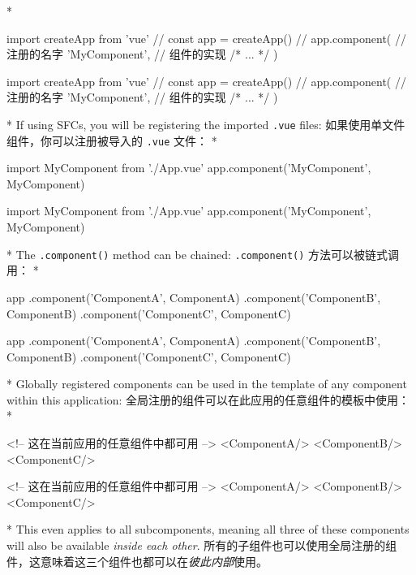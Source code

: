 \begin{paracol}{2}
\switchcolumn[0]*%
\begin{codeJs}
import { createApp } from 'vue'
//
const app = createApp({})
//
app.component(
  // 注册的名字
  'MyComponent',
  // 组件的实现
  {
    /* ... */
  }
)
\end{codeJs}
\switchcolumn
\begin{codeJs}
import { createApp } from 'vue'
//
const app = createApp({})
//
app.component(
  // 注册的名字
  'MyComponent',
  // 组件的实现
  {
    /* ... */
  }
)
\end{codeJs}
\switchcolumn[0]*%
If using SFCs, you will be registering the imported \texttt{.vue} files:
\switchcolumn
如果使用单文件组件，你可以注册被导入的 \texttt{.vue} 文件：
\switchcolumn[0]*%
\begin{codeJs}
import MyComponent from './App.vue'
app.component('MyComponent', MyComponent)
\end{codeJs}
\switchcolumn
\begin{codeJs}
import MyComponent from './App.vue'
app.component('MyComponent', MyComponent)
\end{codeJs}


\switchcolumn[0]*%
The \texttt{.component()} method can be chained:
\switchcolumn
\texttt{.component()} 方法可以被链式调用：
\switchcolumn[0]*%
\begin{codeJs}
app
  .component('ComponentA', ComponentA)
  .component('ComponentB', ComponentB)
  .component('ComponentC', ComponentC)
\end{codeJs}
\switchcolumn
\begin{codeJs}
app
  .component('ComponentA', ComponentA)
  .component('ComponentB', ComponentB)
  .component('ComponentC', ComponentC)
\end{codeJs}
\switchcolumn[0]*%
Globally registered components can be used in the template of any
component within this application:
\switchcolumn
全局注册的组件可以在此应用的任意组件的模板中使用：
\switchcolumn[0]*%
\begin{codeHtml}
<!-- 这在当前应用的任意组件中都可用 -->
<ComponentA/>
<ComponentB/>
<ComponentC/>
\end{codeHtml}
\switchcolumn
\begin{codeHtml}
<!-- 这在当前应用的任意组件中都可用 -->
<ComponentA/>
<ComponentB/>
<ComponentC/>
\end{codeHtml}
\switchcolumn[0]*%
This even applies to all subcomponents, meaning all three of these
components will also be available \emph{inside each other}.
\switchcolumn
所有的子组件也可以使用全局注册的组件，这意味着这三个组件也都可以在\emph{彼此内部}使用。
\end{paracol}

